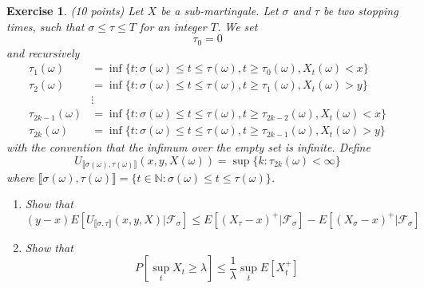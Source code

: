 \documentclass[DIV=classic,a4paper,10pt]{scrartcl}
\newtheorem{exercise}[theorem]{Exercise}
\theoremstyle{nonumberplain}
\newtheorem{proof}{Proof}
\numberwithin{equation}{section}
\begin{document}
\begin{exercise}(10 points)
    Let $X$ be a sub-martingale.
    Let $\sigma$ and $\tau$ be two stopping times, such that $\sigma\leq \tau \leq T$ for an integer $T$.
    We set
    \begin{equation*}
        \tau_0=0
    \end{equation*}
    and recursively
    \begin{align*}
        \tau_1(\omega) & = \inf\{t\colon \sigma(\omega)\leq t\leq \tau(\omega), t\geq \tau_0(\omega), X_t(\omega) < x\}\\
        \tau_2(\omega) & = \inf\{t\colon \sigma(\omega)\leq t\leq \tau(\omega), t\geq \tau_1(\omega), X_t(\omega)>y\}\\
        & \vdots\\
        \tau_{2k-1}(\omega) & = \inf\{t \colon \sigma(\omega)\leq t\leq \tau(\omega), t\geq \tau_{2k-2}(\omega), X_t(\omega) < x\}\\
        \tau_{2k}(\omega) & = \inf\{t \colon \sigma(\omega)\leq t\leq \tau(\omega), t\geq \tau_{2k-1}(\omega), X_t(\omega)>y\}
    \end{align*}
    with the convention that the infimum over the empty set is infinite.
    Define
    \begin{equation*}
        U_{\llbracket \sigma(\omega),\tau(\omega)\rrbracket}(x,y,X(\omega))=\sup\{k\colon \tau_{2k}(\omega)<\infty\}
    \end{equation*}
    where $\llbracket \sigma(\omega),\tau(\omega)\rrbracket=\{t \in \mathbb{N}\colon \sigma(\omega)\leq t\leq \tau(\omega)\}$.
    \begin{enumerate}[label=\textit{(\roman*)}]
        \item Show that
            \begin{equation*}
                \left( y-x \right)E\left[  U_{\llbracket \sigma,\tau\rrbracket}(x,y,X) |\mathcal{F}_{\sigma}\right]\leq E\left[ \left( X_{\tau}-x \right)^+ |\mathcal{F}_{\sigma}\right]-E\left[ \left( X_{\sigma}-x \right)^+ |\mathcal{F}_{\sigma}\right]
            \end{equation*}
        \item Show that
            \begin{equation*}
                P\left[ \sup_{t} X_t \geq \lambda \right]\leq \frac{1}{\lambda}\sup_t E\left[ X_t^+ \right]
            \end{equation*}
    \end{enumerate}
\end{exercise}
    
\end{document}
